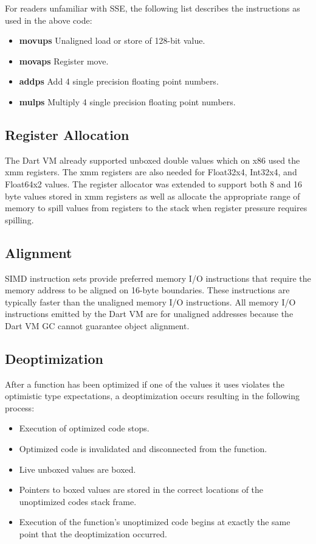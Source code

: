 \documentclass[preprint]{sigplanconf}
\begin{document}
For readers unfamiliar with SSE, the following list describes the instructions
as used in the above code:

\begin{itemize}
\item \textbf{movups} Unaligned load or store of 128-bit value.
\item \textbf{movaps} Register move.
\item \textbf{addps} Add 4 single precision floating point numbers.
\item \textbf{mulps} Multiply 4 single precision floating point numbers.
\end{itemize}

\subsection{Register Allocation}

The Dart VM already supported unboxed double values which on x86 used the xmm
registers. The xmm registers are also needed for Float32x4, Int32x4, and
Float64x2 values. The register allocator was extended to support both 8 and 16
byte values stored in xmm registers as well as allocate the appropriate range of
memory to spill values from registers to the stack when register pressure
requires spilling.

\subsection{Alignment}

SIMD instruction sets provide preferred memory I/O instructions that require the
memory address to be aligned on 16-byte boundaries. These instructions are
typically faster than the unaligned memory I/O instructions. All memory I/O
instructions emitted by the Dart VM are for unaligned addresses because the Dart
VM GC cannot guarantee object alignment.

\subsection{Deoptimization}
\label{deoptimizing}

After a function has been optimized if one of the values it uses violates the
optimistic type expectations, a deoptimization occurs resulting in the following
process:

\begin{itemize}
\item
Execution of optimized code stops.

\item
Optimized code is invalidated and disconnected from the function.

\item
Live unboxed values are boxed.

\item
Pointers to boxed values are stored in the correct locations of the unoptimized
codes stack frame.

\item
Execution of the function's unoptimized code begins at exactly the same point
that the deoptimization occurred.

\end{itemize}
\end{document}
